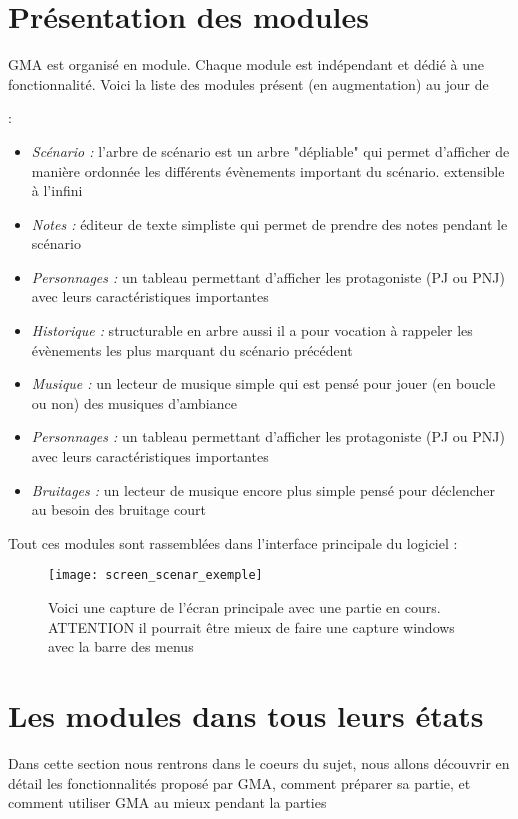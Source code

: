 \documentclass[12pt]{article}
\begin{document}
\section{Présentation des modules}\label{modules}
GMA est organisé en module. Chaque module est indépendant et dédié à une fonctionnalité. Voici la liste des modules présent (en augmentation) au jour de \date{\today} :
\begin{itemize}
    \item \emph{Scénario :} l'arbre de scénario est un arbre "dépliable" qui permet d'afficher de manière ordonnée les différents évènements important du scénario. extensible à l'infini
    \item \emph{Notes :} éditeur de texte simpliste qui permet de prendre des notes pendant le scénario
    \item \emph{Personnages :} un tableau permettant d'afficher les protagoniste (PJ ou PNJ) avec leurs caractéristiques importantes
    \item \emph{Historique :} structurable en arbre aussi il a pour vocation à rappeler les évènements les plus marquant du scénario précédent
    \item \emph{Musique :} un lecteur de musique simple qui est pensé pour jouer (en boucle ou non) des musiques d'ambiance
    \item \emph{Personnages :} un tableau permettant d'afficher les protagoniste (PJ ou PNJ) avec leurs caractéristiques importantes
    \item \emph{Bruitages :} un lecteur de musique encore plus simple pensé pour déclencher au besoin des bruitage court
\end{itemize}
Tout ces modules sont rassemblées dans l'interface principale du logiciel :
\begin{figure}[h]
    \texttt{[image: screen\_scenar\_exemple]}
    \caption{Voici une capture de l'écran principale avec une partie en cours.
    ATTENTION il pourrait être mieux de faire une capture windows avec la barre des menus}
\end{figure}



\section{Les modules dans tous leurs états}\label{details}
Dans cette section nous rentrons dans le coeurs du sujet, nous allons découvrir en détail les fonctionnalités proposé par GMA, comment préparer sa partie, et comment utiliser GMA au mieux pendant la parties
\end{document}
